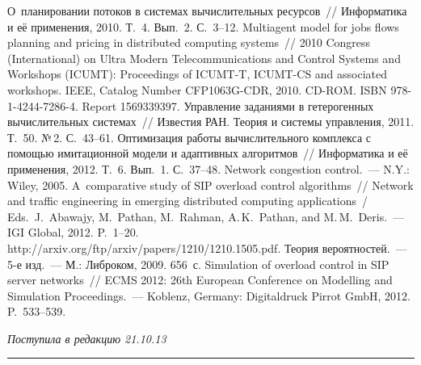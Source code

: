 \begin{multicols}{2}
{\small\frenchspacing
{%
\begin{thebibliography}{9}
 О~планировании потоков в системах вычислительных ресурсов~// Информатика и её 
применения, 2010. Т.~4. Вып.~2. С.~3--12.
 Multiagent model for jobs flows planning and pricing in distributed computing systems~// 2010 
Congress (International) on Ultra Modern Telecommunications and Control Systems and Workshops (ICUMT): 
Proceedings of ICUMT-T, ICUMT-CS and associated workshops. IEEE, Catalog Number CFP1063G-CDR, 
2010. CD-ROM. \mbox{ISBN} 978-1-4244-7286-4. Report 1569339397.
 Управ\-ле\-ние заданиями в гетерогенных 
вычислительных сис\-те\-мах~// Известия РАН. Теория и системы управления, 2011. 
Т.~50. №\,2. С.~43--61.
 Оптимизация работы вычислительного комплекса с помощью имитационной модели 
и адаптивных алгоритмов~// Информатика и её применения, 2012. Т.~6. Вып.~1. С.~37--48.
 Network congestion control.~--- N.Y.: Wiley, 2005.
 A~comparative study of SIP overload control algorithms~// Network and traffic 
engineering in emerging distributed computing applications~/ Eds.\ J.~Abawajy, M.~Pathan, 
M.~Rahman, A.\,K.~Pathan, and M.\,M.~Deris.~--- IGI Global, 2012. P.~1--20. {\sf 
http://arxiv.org/ftp/arxiv/papers/1210/1210.1505.pdf}.
 Теория вероятностей.~--- 5-е изд.~--- М.: Либроком, 2009. 656~с.
 Simulation of 
overload control in SIP server networks~// ECMS 2012: 26th European Conference on Modelling and 
Simulation Proceedings.~--- Koblenz, Germany: Digitaldruck Pirrot GmbH, 2012. P.~533--539.

\end{thebibliography} } }



\end{multicols}

\vspace*{-6pt}

\hfill{\small\textit{Поступила в редакцию 21.10.13}}


\vspace*{9pt}

\hrule

\vspace*{3pt}

